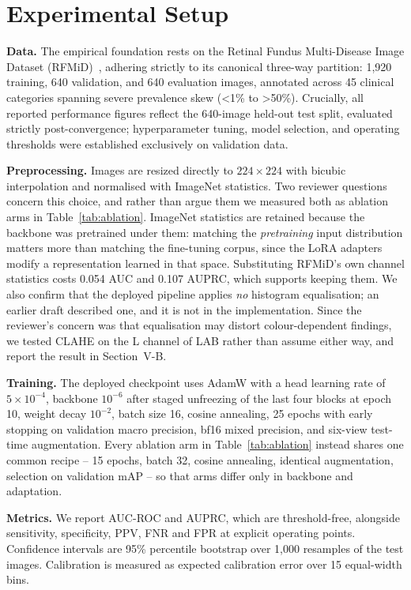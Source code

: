 \documentclass[11pt]{IEEEtran}
\begin{document}
\section{Experimental Setup}

\textbf{Data.} The empirical foundation rests on the Retinal Fundus Multi-Disease Image Dataset (RFMiD)~\cite{rfmid2021},
adhering strictly to its canonical three-way partition: 1{,}920 training, 640 validation, and 640 evaluation images,
annotated across 45 clinical categories spanning severe prevalence skew (<1\% to >50\%). Crucially, all reported
performance figures reflect the 640-image held-out test split, evaluated strictly post-convergence; hyperparameter
tuning, model selection, and operating thresholds were established exclusively on validation data.

\textbf{Preprocessing.} Images are resized directly to $224\times224$ with bicubic interpolation
and normalised with ImageNet statistics. Two reviewer questions concern this choice, and rather
than argue them we measured both as ablation arms in Table~\ref{tab:ablation}. ImageNet
statistics are retained because the backbone was pretrained under them: matching the
\emph{pretraining} input distribution matters more than matching the fine-tuning corpus, since
the LoRA adapters modify a representation learned in that space. Substituting RFMiD's own channel
statistics costs 0.054 AUC and 0.107 AUPRC, which supports keeping them. We also confirm that the
deployed pipeline applies \emph{no} histogram equalisation; an earlier draft described one, and it
is not in the implementation. Since the reviewer's concern was that equalisation may distort
colour-dependent findings, we tested CLAHE on the L channel of LAB rather than assume either way,
and report the result in Section~V-B.

\textbf{Training.} The deployed checkpoint uses AdamW with a head learning rate of
$5\times10^{-4}$, backbone $10^{-6}$ after staged unfreezing of the last four blocks at epoch 10,
weight decay $10^{-2}$, batch size 16, cosine annealing, 25 epochs with early stopping on
validation macro precision, bf16 mixed precision, and six-view test-time augmentation. Every
ablation arm in Table~\ref{tab:ablation} instead shares one common recipe -- 15 epochs, batch 32,
cosine annealing, identical augmentation, selection on validation mAP -- so that arms differ only
in backbone and adaptation.

\textbf{Metrics.} We report AUC-ROC and AUPRC, which are threshold-free, alongside sensitivity,
specificity, PPV, FNR and FPR at explicit operating points. Confidence intervals are 95\%
percentile bootstrap over 1{,}000 resamples of the test images. Calibration is measured as
expected calibration error over 15 equal-width bins.
\end{document}
